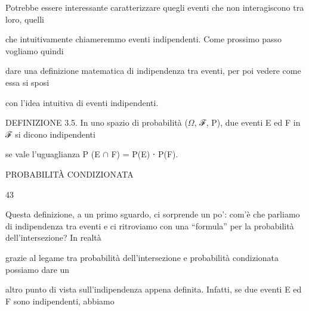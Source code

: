\documentclass[a4paper,portrait,12pt]{article}
\begin{document}
\begin{flushleft}
Potrebbe essere interessante caratterizzare quegli eventi che non interagiscono tra loro, quelli
\end{flushleft}


\begin{flushleft}
che intuitivamente chiameremmo eventi indipendenti. Come prossimo passo vogliamo quindi
\end{flushleft}


\begin{flushleft}
dare una definizione matematica di indipendenza tra eventi, per poi vedere come essa si sposi
\end{flushleft}


\begin{flushleft}
con l'idea intuitiva di eventi indipendenti.
\end{flushleft}


\begin{flushleft}
DEFINIZIONE 3.5. In uno spazio di probabilit\`{a} ($\Omega$, ℱ, P), due eventi E ed F in ℱ si dicono indipendenti
\end{flushleft}


\begin{flushleft}
se vale l'uguaglianza P (E $\cap$ F) = P(E) ⋅ P(F).
\end{flushleft}





\begin{flushleft}
\newpage
PROBABILIT\`{A} CONDIZIONATA
\end{flushleft}





43





\begin{flushleft}
Questa definizione, a un primo sguardo, ci sorprende un po': com'\`{e} che parliamo di indipendenza tra eventi e ci ritroviamo con una {``}formula'' per la probabilit\`{a} dell'intersezione? In realt\`{a}
\end{flushleft}


\begin{flushleft}
grazie al legame tra probabilit\`{a} dell'intersezione e probabilit\`{a} condizionata possiamo dare un
\end{flushleft}


\begin{flushleft}
altro punto di vista sull'indipendenza appena definita. Infatti, se due eventi E ed F sono indipendenti, abbiamo
\end{flushleft}
\end{document}
